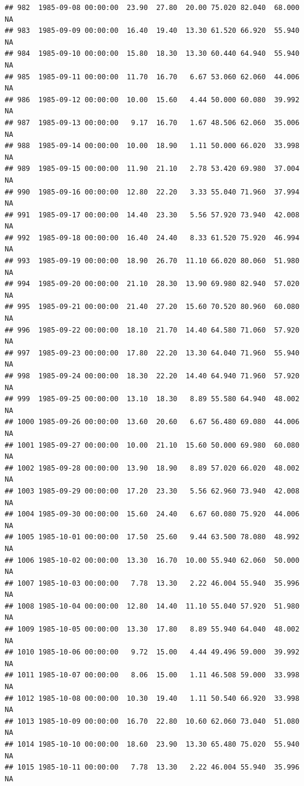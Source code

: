\documentclass{article}\usepackage{graphicx, color}
\makeatletter
\newenvironment{kframe}{%
 \def\at@end@of@kframe{}%
 \ifinner\ifhmode%
  \def\at@end@of@kframe{\end{minipage}}%
  \begin{minipage}{\columnwidth}%
 \fi\fi%
 \def\FrameCommand##1{\hskip\@totalleftmargin \hskip-\fboxsep
 \colorbox{shadecolor}{##1}\hskip-\fboxsep
     \hskip-\linewidth \hskip-\@totalleftmargin \hskip\columnwidth}%
 \MakeFramed {\advance\hsize-\width
   \@totalleftmargin\z@ \linewidth\hsize
   \@setminipage}}%
 {\par\unskip\endMakeFramed%
 \at@end@of@kframe}
\newenvironment{knitrout}{}{} %
\makeatother
\begin{document}
\begin{knitrout}
\begin{kframe}
\begin{verbatim}
## 982  1985-09-08 00:00:00  23.90  27.80  20.00 75.020 82.040  68.000     NA
## 983  1985-09-09 00:00:00  16.40  19.40  13.30 61.520 66.920  55.940     NA
## 984  1985-09-10 00:00:00  15.80  18.30  13.30 60.440 64.940  55.940     NA
## 985  1985-09-11 00:00:00  11.70  16.70   6.67 53.060 62.060  44.006     NA
## 986  1985-09-12 00:00:00  10.00  15.60   4.44 50.000 60.080  39.992     NA
## 987  1985-09-13 00:00:00   9.17  16.70   1.67 48.506 62.060  35.006     NA
## 988  1985-09-14 00:00:00  10.00  18.90   1.11 50.000 66.020  33.998     NA
## 989  1985-09-15 00:00:00  11.90  21.10   2.78 53.420 69.980  37.004     NA
## 990  1985-09-16 00:00:00  12.80  22.20   3.33 55.040 71.960  37.994     NA
## 991  1985-09-17 00:00:00  14.40  23.30   5.56 57.920 73.940  42.008     NA
## 992  1985-09-18 00:00:00  16.40  24.40   8.33 61.520 75.920  46.994     NA
## 993  1985-09-19 00:00:00  18.90  26.70  11.10 66.020 80.060  51.980     NA
## 994  1985-09-20 00:00:00  21.10  28.30  13.90 69.980 82.940  57.020     NA
## 995  1985-09-21 00:00:00  21.40  27.20  15.60 70.520 80.960  60.080     NA
## 996  1985-09-22 00:00:00  18.10  21.70  14.40 64.580 71.060  57.920     NA
## 997  1985-09-23 00:00:00  17.80  22.20  13.30 64.040 71.960  55.940     NA
## 998  1985-09-24 00:00:00  18.30  22.20  14.40 64.940 71.960  57.920     NA
## 999  1985-09-25 00:00:00  13.10  18.30   8.89 55.580 64.940  48.002     NA
## 1000 1985-09-26 00:00:00  13.60  20.60   6.67 56.480 69.080  44.006     NA
## 1001 1985-09-27 00:00:00  10.00  21.10  15.60 50.000 69.980  60.080     NA
## 1002 1985-09-28 00:00:00  13.90  18.90   8.89 57.020 66.020  48.002     NA
## 1003 1985-09-29 00:00:00  17.20  23.30   5.56 62.960 73.940  42.008     NA
## 1004 1985-09-30 00:00:00  15.60  24.40   6.67 60.080 75.920  44.006     NA
## 1005 1985-10-01 00:00:00  17.50  25.60   9.44 63.500 78.080  48.992     NA
## 1006 1985-10-02 00:00:00  13.30  16.70  10.00 55.940 62.060  50.000     NA
## 1007 1985-10-03 00:00:00   7.78  13.30   2.22 46.004 55.940  35.996     NA
## 1008 1985-10-04 00:00:00  12.80  14.40  11.10 55.040 57.920  51.980     NA
## 1009 1985-10-05 00:00:00  13.30  17.80   8.89 55.940 64.040  48.002     NA
## 1010 1985-10-06 00:00:00   9.72  15.00   4.44 49.496 59.000  39.992     NA
## 1011 1985-10-07 00:00:00   8.06  15.00   1.11 46.508 59.000  33.998     NA
## 1012 1985-10-08 00:00:00  10.30  19.40   1.11 50.540 66.920  33.998     NA
## 1013 1985-10-09 00:00:00  16.70  22.80  10.60 62.060 73.040  51.080     NA
## 1014 1985-10-10 00:00:00  18.60  23.90  13.30 65.480 75.020  55.940     NA
## 1015 1985-10-11 00:00:00   7.78  13.30   2.22 46.004 55.940  35.996     NA

\end{verbatim}
\end{kframe}
\end{knitrout}
\end{document}
